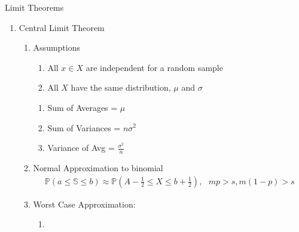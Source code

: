 \documentclass[12pt]{article}
\renewcommand{\=}[1]{\stackrel{#1}{=}} %
\theoremstyle{definition}
\theoremstyle{remark}
\begin{document}
Limit Theorems
\begin{enumerate}
\item Central Limit Theorem
  \begin{enumerate}
  \item Assumptions
    \begin{enumerate}
    \item All $x \in X$ are independent for a random sample
    \item All $X$ have the same distribution, $\mu$ and $\sigma$
    \end{enumerate}
    \begin{enumerate}
    \item Sum of Averages = $\mu$
    \item Sum of Variances = $n\sigma^2$
    \item Variance of Avg = $\frac{\sigma^2}{n}$
    \end{enumerate}
  \item Normal Approximation to binomial
        \begin{align*}
      \mathbb{P}(a \leq \mathbb{S} \leq b) \approx
      \mathbb{P}(A-\frac{1}{2} \leq X \leq b + \frac{1}{2}),\textrm{ } mp > s, m(1-p)>s
    \end{align*}
  \item Worst Case Approximation:
    \begin{enumerate}
    \item 
    \end{enumerate}
  \end{enumerate}
\end{enumerate}
\end{document}
